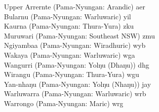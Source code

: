 \documentclass[output=paper,draft,draftmode,colorlinks,citecolor=brown]{langscibook}
\begin{document}
\begin{tabbing}
Upper Arrernte (Pama-Nyungan: Arandic) \> aer\\
Bularnu (Pama-Nyungan: Warluwaric) \> yil\\
Kaurna (Pama-Nyungan: Thura-Yura) \> zku\\
Muruwari (Pama-Nyungan: Southeast NSW) \> zmu\\
Ngiyambaa (Pama-Nyungan: Wiradhuric) \> wyb\\
Wakaya (Pama-Nyungan: Warluwaric) \> wga\\
Wangurri (Pama-Nyungan: Yolŋu (Dhaŋu)) \> dhg\\
Wirangu (Pama-Nyungan: Thura-Yura) \> wgu\\
Yan-nhaŋu (Pama-Nyungan: Yolŋu (Nhaŋu)) \> jay\\
Warluwarra (Pama-Nyungan: Warluwaric) \> wrb\\
Warrongo (Pama-Nyungan: Maric) \> wrg\\
\end{tabbing}
\end{document}
